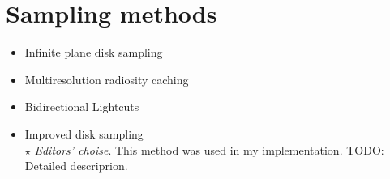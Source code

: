 \section{Sampling methods}

\begin{itemize}
    \item{Infinite plane disk sampling \cite{Jensen:2001:PMS:383259.383319}}
    \item{Multiresolution radiosity caching \cite{Christensen:2012:MRC:2343045.2343108}}
    \item{Bidirectional Lightcuts \cite{Walter:2012:BL:2185520.2185555}}
    \item{Improved disk sampling \cite{King:2013:BIS:2504459.2504520}}\\
    $\star$ \textit{Editors' choise}. This method was used in my implementation.
    TODO: Detailed descriprion.
\end{itemize}


